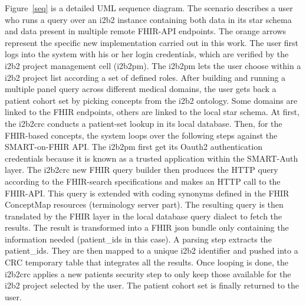 \documentclass{amia}
\newcommand{\remNico}[1]{\todo[color=orange]{[NP]{\scriptsize #1\par}}}
\begin{document}
Figure~\ref{seq} is a detailed UML sequence diagram. The scenario describes a user who runs a query over an i2b2 instance containing both data in its star schema and data present in multiple remote FHIR-API endpoints. The orange arrows represent the specific new implementation carried out in this work. The user first logs into the system with his or her login credentials, which are verified by the i2b2 project management cell (i2b2pm). The i2b2pm lets the user choose within a i2b2 project list according a set of defined roles. After building and running a multiple panel query across different medical domains, the user gets back a patient cohort set by picking concepts from the i2b2 ontology. Some domains are linked to the FHIR endpoints, others are linked to the local star schema. At first, the i2b2crc conducts a patient-set lookup in its local database. Then, for the FHIR-based concepts, the system loops over the following steps against the SMART-on-FHIR API. The i2b2pm first get its Oauth2 authentication credentials because it is known as a trusted application within the SMART-Auth layer. The i2b2crc new FHIR query builder then produces the HTTP query according to the FHIR-search specifications and makes an HTTP call to the FHIR-API. This query is extended with coding synonyms defined in the FHIR ConceptMap resources (terminology server part). The resulting query is then translated by the FHIR layer in the local database query dialect to fetch the results. The result is transformed into a FHIR json bundle only containing the information needed (patient\_ids in this case). A parsing step extracts the patient\_ids. They are then mapped to a unique i2b2 identifier and pushed into a CRC temporary table that integrates all the results. Once looping is done, the i2b2crc applies a new patients security step to only keep those available for the i2b2 project selected by the user. The patient cohort set is finally returned to the user.
\end{document}
